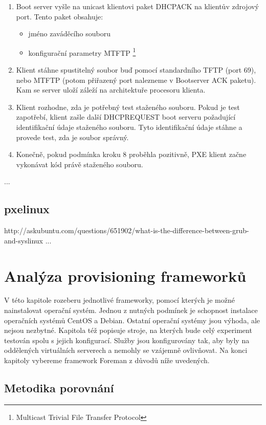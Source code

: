 \documentclass[thesis=B,czech]{FITthesis}[2012/06/26]
\begin{document}
\begin{enumerate}
\item  Boot server vyšle na unicast klientovi paket DHCPACK na klientův zdrojový port. Tento paket obsahuje:

\begin{itemize}
\item jméno zaváděcího souboru
\item konfigurační parametry MTFTP \footnote{Multicast Trivial File Transfer Protocol}
\end{itemize}

\item  Klient stáhne spustitelný soubor buď pomocí standardního TFTP (port 69), nebo MTFTP (potom přiřazený port nalezneme v Bootserver ACK paketu). Kam se server uloží záleží na architektuře procesoru klienta.

\item  Klient rozhodne, zda je potřebný test staženého souboru. Pokud je test zapotřebí, klient zašle další DHCPREQUEST boot serveru požadující identifikační údaje staženého souboru. Tyto identifikační údaje stáhne a provede test, zda je soubor správný.

\item  Konečně, pokud podmínka kroku 8 proběhla pozitivně, PXE klient začne vykonávat kód právě staženého souboru.
\end{enumerate}



...
\section{pxelinux}
http://askubuntu.com/questions/651902/what-is-the-difference-between-grub-and-syslinux
...
\chapter{Analýza provisioning frameworků}

V této kapitole rozeberu jednotlivé frameworky, pomocí kterých je možné nainstalovat operační systém. Jednou z nutných podmínek je schopnost instalace operačních systémů CentOS a Debian. Ostatní operační systémy jsou výhoda, ale nejsou nezbytné. Kapitola též popisuje stroje, na kterých bude celý experiment testován spolu s jejich konfigurací. Služby jsou konfigurovány tak, aby byly na oddělených virtuálních serverech a nemohly se vzájemně ovlivňovat. Na konci kapitoly vybereme framework Foreman z důvodů níže uvedených.

\section{Metodika porovnání}
\end{document}
